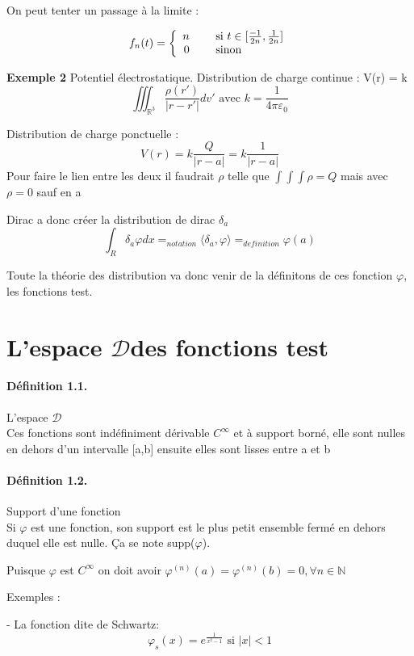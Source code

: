 \documentclass[12pt,a4paper]{report}
\newcommand{\D}{\ensuremath{\mathcal{D}}}
\begin{document}
On peut tenter un passage à la limite :

\[f_n(t) = \left \{
   \begin{array}{r l}
      n \quad & \text{ si } t \in [ \tfrac{-1}{2n}, \tfrac{1}{2n} ] \\
      0 \quad & \text{ sinon}
   \end{array}
   \right .\]
   
\textbf{Exemple 2} Potentiel électrostatique.
Distribution de charge continue : V(r) = k 
\[
	\iiint_{\mathbb{R}^3} \dfrac{\rho(r')}{\vert r- r'\vert} dv' \text{ avec } k = \dfrac{1}{4\pi\varepsilon_0} 
\]

Distribution de charge ponctuelle :
\[
	V(r) = k\dfrac{Q}{\vert r - a \vert} = k\dfrac{1}{\vert r - a \vert}
\]
Pour faire le lien entre les deux il faudrait \(\rho\) telle que \(\int\int\int \rho = Q\) mais avec \(\rho = 0\) sauf en a

Dirac a donc créer la distribution de dirac \(\delta_a\)
\[
	\int_R \delta_a \varphi dx =_{notation} \langle \delta_a, \varphi \rangle =_{definition} \varphi(a)
\]

Toute la théorie des distribution va donc venir de la définitons de ces fonction $\varphi$, les fonctions test.

\section{L'espace \D des fonctions test}

\paragraph{Définition 1.1.} L'espace \D\\
Ces fonctions sont indéfiniment dérivable $C^\infty$ et à support borné, elle sont nulles en dehors d'un intervalle [a,b] ensuite elles sont lisses entre a et b

\paragraph{Définition 1.2.} Support d'une fonction\\
Si \(\varphi\) est une fonction, son support est le plus petit ensemble fermé en dehors duquel elle est nulle. Ça se note supp(\(\varphi\)).

Puisque \(\varphi\) est \(C^{\infty}\) on doit avoir \(\varphi^{(n)}(a) = \varphi^{(n)}(b) = 0, \forall n \in \mathbb{N}\)

Exemples : \par
- La fonction dite de Schwartz:
\[
	\varphi_s (x) = e^{\frac{1}{x^2-1} }\text{ si } \vert x \vert < 1
\]
\end{document}
